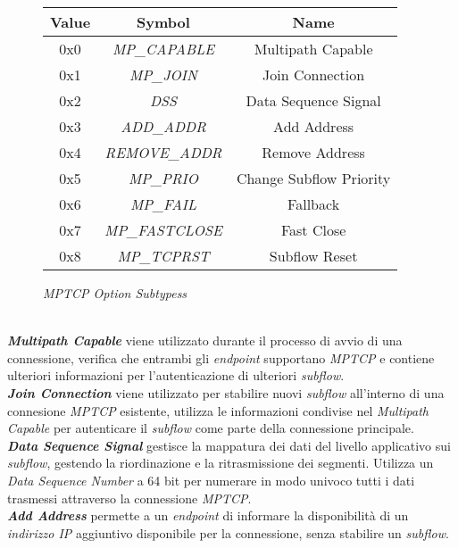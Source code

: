 \begin{figure}[!h]
    \centering
    \begin{tabular}{|c|c|c|}
        \hline
        \textbf{Value} & \textbf{Symbol} & \textbf{Name} \\
        \hline
        0x0 & \emph{MP\_CAPABLE} & Multipath Capable \\
        \hline
        0x1 & \emph{MP\_JOIN} & Join Connection \\
        \hline
        0x2 & \emph{DSS} & Data Sequence Signal \\
        \hline
        0x3 & \emph{ADD\_ADDR} & Add Address \\
        \hline
        0x4 & \emph{REMOVE\_ADDR} & Remove Address \\
        \hline
        0x5 & \emph{MP\_PRIO} & Change Subflow Priority \\
        \hline
        0x6 & \emph{MP\_FAIL} & Fallback \\
        \hline
        0x7 & \emph{MP\_FASTCLOSE} & Fast Close \\
        \hline
        0x8 & \emph{MP\_TCPRST} & Subflow Reset \\
        \hline
    \end{tabular}
    \caption{\emph{MPTCP Option Subtypess}}
    \label{options-subtypes}
\end{figure}
~\\
\indent \textbf{\emph{Multipath Capable}} viene utilizzato durante il processo di avvio di una connessione, verifica che entrambi gli \emph{endpoint} supportano \emph{MPTCP} e contiene ulteriori informazioni per l'autenticazione di ulteriori \emph{subflow}.
\\
\indent \textbf{\emph{Join Connection}} viene utilizzato per stabilire nuovi \emph{subflow} all'interno di una connesione \emph{MPTCP} esistente, utilizza le informazioni condivise nel \emph{Multipath Capable} per autenticare il \emph{subflow} come parte della connessione principale.
\\
\indent \textbf{\emph{Data Sequence Signal}} gestisce la mappatura dei dati del livello applicativo sui \emph{subflow}, gestendo la riordinazione e la ritrasmissione dei segmenti. 
Utilizza un \emph{Data Sequence Number} a 64 bit per numerare in modo univoco tutti i dati trasmessi attraverso la connessione \emph{MPTCP}.
\\
\indent \textbf{\emph{Add Address}} permette a un \emph{endpoint} di informare la disponibilità di un \emph{indirizzo IP} aggiuntivo disponibile per la connessione, senza stabilire un \emph{subflow}.

